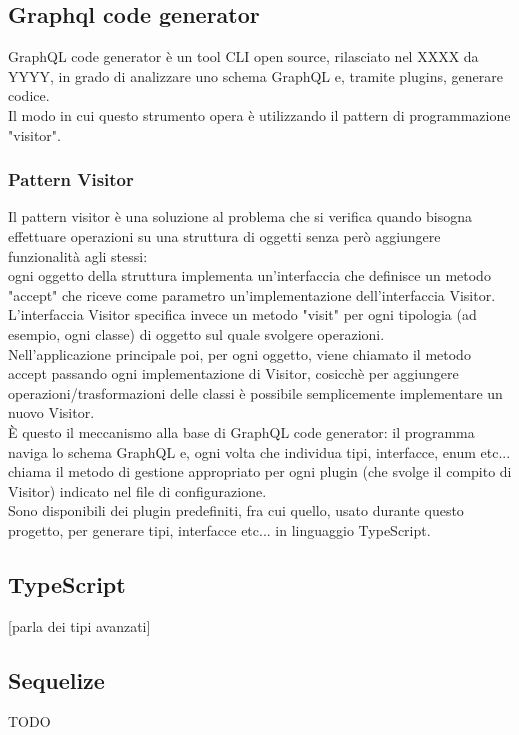 \documentclass[a4paper, 12pt]{scrartcl}
\begin{document}
    \subsection*{Graphql code generator}
      GraphQL code generator è un tool CLI open source, rilasciato nel XXXX da YYYY, in grado di analizzare uno schema GraphQL e, tramite plugins, generare codice.\\
      Il modo in cui questo strumento opera è utilizzando il pattern di programmazione "visitor".
      \subsubsection*{Pattern Visitor}
        Il pattern visitor è una soluzione al problema che si verifica quando bisogna effettuare operazioni su una struttura di oggetti senza però aggiungere funzionalità agli stessi:\\
        ogni oggetto della struttura implementa un'interfaccia che definisce un metodo "accept" che riceve come parametro un'implementazione dell'interfaccia Visitor.\\
        L'interfaccia Visitor specifica invece un metodo "visit" per ogni tipologia (ad esempio, ogni classe) di oggetto sul quale svolgere operazioni.\\
        Nell'applicazione principale poi, per ogni oggetto, viene chiamato il metodo accept passando ogni implementazione di Visitor, cosicchè per aggiungere operazioni/trasformazioni delle classi è possibile semplicemente implementare un nuovo Visitor.\\

        È questo il meccanismo alla base di GraphQL code generator: il programma naviga lo schema GraphQL e, ogni volta che individua tipi, interfacce, enum etc... chiama il metodo di gestione appropriato per ogni plugin (che svolge il compito di Visitor) indicato nel file di configurazione.\\

        Sono disponibili dei plugin predefiniti, fra cui quello, usato durante questo progetto, per generare tipi, interfacce etc... in linguaggio TypeScript.\\

    \subsection*{TypeScript}
    [parla dei tipi avanzati]

    \subsection*{Sequelize}
    TODO
  \newpage
\end{document}

